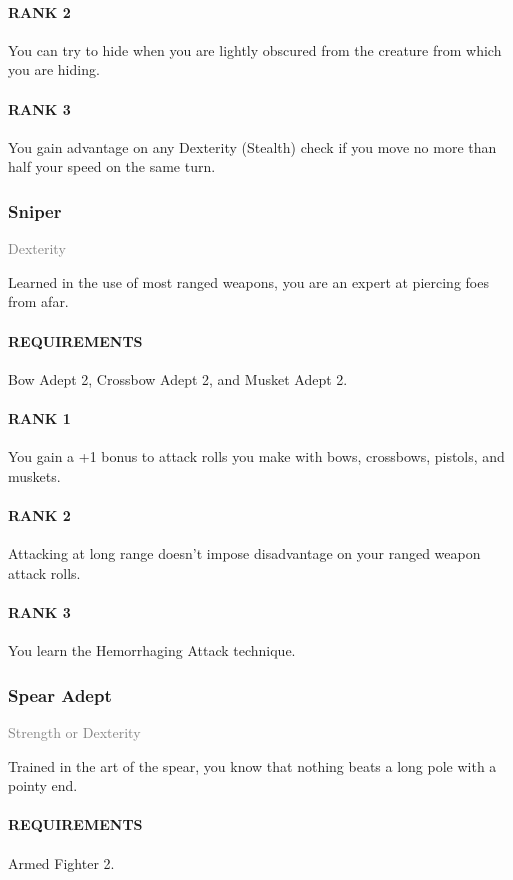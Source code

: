 \paragraph{RANK 2} You can try to hide when you are lightly obscured from the creature from which you are hiding.
\paragraph{RANK 3} You gain advantage on any Dexterity (Stealth) check if you move no more than half your speed on the same turn.

\subsubsection{Sniper} \label{feat::sniper}
\small{\textcolor{gray}{Dexterity}}

\normalsize
Learned in the use of most ranged weapons, you are an expert at piercing foes from afar.
\paragraph{REQUIREMENTS} Bow Adept 2, Crossbow Adept 2, and Musket Adept 2.
\paragraph{RANK 1} You gain a +1 bonus to attack rolls you make with bows, crossbows, pistols, and muskets.
\paragraph{RANK 2} Attacking at long range doesn't impose disadvantage on your ranged weapon attack rolls.
\paragraph{RANK 3} You learn the Hemorrhaging Attack technique.

\subsubsection{Spear Adept} \label{feat::spearadept}
\small{\textcolor{gray}{Strength or Dexterity}}

\normalsize
Trained in the art of the spear, you know that nothing beats a long pole with a pointy end.
\paragraph{REQUIREMENTS} Armed Fighter 2.
